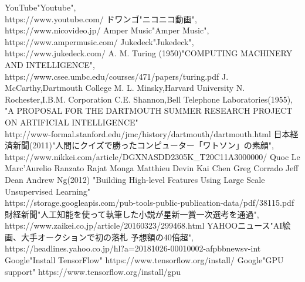 \documentclass[12pt]{jreport}
\begin{document}
\begin{thebibliography}{99}%



YouTube"Youtube",\\
https://www.youtube.com/
ドワンゴ"ニコニコ動画",\\
https://www.nicovideo.jp/
Amper Music"Amper Music",\\
https://www.ampermusic.com/
Jukedeck"Jukedeck",\\
https://www.jukedeck.com/
A. M. Turing (1950)"COMPUTING MACHINERY AND INTELLIGENCE",\\
https://www.csee.umbc.edu/courses/471/papers/turing.pdf
J. McCarthy,Dartmouth College M. L. Minsky,Harvard University N.\\
Rochester,I.B.M. Corporation C.E. Shannon,Bell Telephone Laboratories(1955),
"A PROPOSAL FOR THE DARTMOUTH SUMMER RESEARCH PROJECT ON ARTIFICIAL INTELLIGENCE"\\
http://www-formal.stanford.edu/jmc/history/dartmouth/dartmouth.html
日本経済新聞(2011)"人間にクイズで勝ったコンピューター「ワトソン」の素顔",\\
https://www.nikkei.com/article/DGXNASDD2305K\_T20C11A3000000/
Quoc Le Marc'Aurelio Ranzato Rajat Monga Matthieu Devin Kai Chen Greg Corrado Jeff Dean Andrew Ng(2012)
"Building High-level Features Using Large Scale Unsupervised Learning"\\
https://storage.googleapis.com/pub-tools-public-publication-data/pdf/38115.pdf
財経新聞"人工知能を使って執筆した小説が星新一賞一次選考を通過",\\
https://www.zaikei.co.jp/article/20160323/299468.html
YAHOOニュース"AI絵画、大手オークションで初の落札 予想額の40倍超",\\
https://headlines.yahoo.co.jp/hl?a=20181026-00010002-afpbbnewsv-int
Google"Install TensorFlow"
https://www.tensorflow.org/install/
Google"GPU support"
https://www.tensorflow.org/install/gpu
\end{thebibliography}

\end{document}
